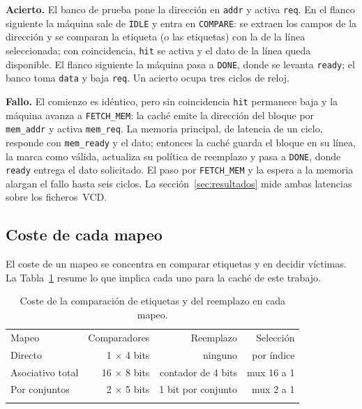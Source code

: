 \documentclass[llncs]{llncs}
\begin{document}
\textbf{Acierto.} El banco de prueba pone la dirección en
\texttt{addr} y activa \texttt{req}. En el flanco siguiente la
máquina sale de \texttt{IDLE} y entra en \texttt{COMPARE}: se extraen
los campos de la dirección y se comparan la etiqueta (o las
etiquetas) con la de la línea seleccionada; con coincidencia,
\texttt{hit} se activa y el dato de la línea queda disponible. El
flanco siguiente la máquina pasa a \texttt{DONE}, donde se levanta
\texttt{ready}; el banco toma \texttt{data} y baja \texttt{req}. Un
acierto ocupa tres ciclos de reloj.

\textbf{Fallo.} El comienzo es idéntico, pero sin coincidencia
\texttt{hit} permanece baja y la máquina avanza a
\texttt{FETCH\_MEM}: la caché emite la dirección del bloque por
\texttt{mem\_addr} y activa \texttt{mem\_req}. La memoria principal,
de latencia de un ciclo, responde con \texttt{mem\_ready} y el dato;
entonces la caché guarda el bloque en su línea, la marca como válida,
actualiza su política de reemplazo y pasa a \texttt{DONE}, donde
\texttt{ready} entrega el dato solicitado. El paso por
\texttt{FETCH\_MEM} y la espera a la memoria alargan el fallo hasta
seis ciclos. La sección~\ref{sec:resultados} mide ambas latencias
sobre los ficheros~VCD.

\subsection{Coste de cada mapeo}

El coste de un mapeo se concentra en comparar etiquetas y en decidir
víctimas. La Tabla~\ref{tab:coste} resume lo que implica cada uno
para la caché de este trabajo.

\begin{table}[t]
\centering
\small
\begin{tabular}{@{}lrrr@{}}
\hline\noalign{\smallskip}
Mapeo & Comparadores & Reemplazo & Selección \\
\noalign{\smallskip}\hline\noalign{\smallskip}
Directo & 1 $\times$ 4 bits & ninguno & por índice \\
Asociativo total & 16 $\times$ 8 bits & contador de 4 bits & mux 16 a 1 \\
Por conjuntos & 2 $\times$ 5 bits & 1 bit por conjunto & mux 2 a 1 \\
\noalign{\smallskip}\hline
\end{tabular}
\caption{Coste de la comparación de etiquetas y del reemplazo en cada mapeo.}
\label{tab:coste}
\end{table}
\end{document}
